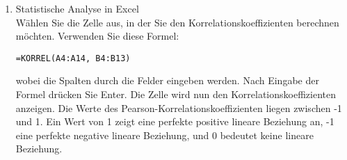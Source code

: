 \documentclass{article}
\begin{document}
\begin{enumerate}
					
					\item Statistische Analyse in Excel\\
					      Wählen Sie die Zelle aus, in der Sie den Korrelationskoeffizienten berechnen möchten.
								Verwenden Sie diese Formel:  								
								\begin{center}
								\texttt{=KORREL(A4:A14, B4:B13)}
								\end{center}
								wobei die Spalten durch die Felder 
								eingeben werden.  Nach Eingabe der Formel drücken Sie Enter. 
								Die Zelle wird nun den Korrelationskoeffizienten anzeigen.
Die Werte des Pearson-Korrelationskoeffizienten liegen zwischen -1 und 1. Ein Wert von 1 zeigt eine perfekte positive lineare Beziehung an, -1 eine perfekte negative lineare Beziehung, und 0 bedeutet keine lineare Beziehung.
					\end{enumerate}
\end{document}
